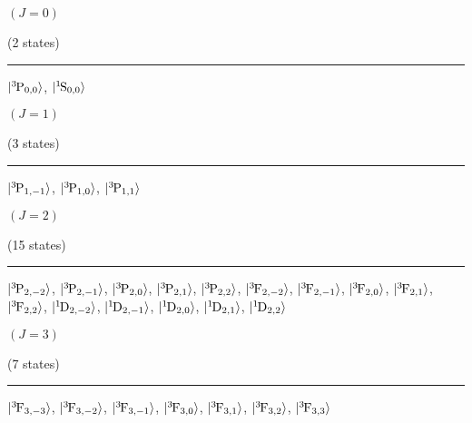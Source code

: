 \begin{mdframed}
\begin{center}
$(J=0)$

(2 states)
\vspace{0.25cm}
\hrule
\vspace{0.25cm}
$|{}^{3}{\kern-0.1em}{\text{P}}_{0,0}\rangle$, $|{}^{1}{\kern-0.1em}{\text{S}}_{0,0}\rangle$
\end{center}
\end{mdframed}

\begin{mdframed}
\begin{center}
$(J=1)$

(3 states)
\vspace{0.25cm}
\hrule
\vspace{0.25cm}
$|{}^{3}{\kern-0.1em}{\text{P}}_{1,-1}\rangle$, $|{}^{3}{\kern-0.1em}{\text{P}}_{1,0}\rangle$, $|{}^{3}{\kern-0.1em}{\text{P}}_{1,1}\rangle$
\end{center}
\end{mdframed}

\begin{mdframed}
\begin{center}
$(J=2)$

(15 states)
\vspace{0.25cm}
\hrule
\vspace{0.25cm}
$|{}^{3}{\kern-0.1em}{\text{P}}_{2,-2}\rangle$, $|{}^{3}{\kern-0.1em}{\text{P}}_{2,-1}\rangle$, $|{}^{3}{\kern-0.1em}{\text{P}}_{2,0}\rangle$, $|{}^{3}{\kern-0.1em}{\text{P}}_{2,1}\rangle$, $|{}^{3}{\kern-0.1em}{\text{P}}_{2,2}\rangle$, $|{}^{3}{\kern-0.1em}{\text{F}}_{2,-2}\rangle$, $|{}^{3}{\kern-0.1em}{\text{F}}_{2,-1}\rangle$, $|{}^{3}{\kern-0.1em}{\text{F}}_{2,0}\rangle$, $|{}^{3}{\kern-0.1em}{\text{F}}_{2,1}\rangle$, $|{}^{3}{\kern-0.1em}{\text{F}}_{2,2}\rangle$, $|{}^{1}{\kern-0.1em}{\text{D}}_{2,-2}\rangle$, $|{}^{1}{\kern-0.1em}{\text{D}}_{2,-1}\rangle$, $|{}^{1}{\kern-0.1em}{\text{D}}_{2,0}\rangle$, $|{}^{1}{\kern-0.1em}{\text{D}}_{2,1}\rangle$, $|{}^{1}{\kern-0.1em}{\text{D}}_{2,2}\rangle$
\end{center}
\end{mdframed}

\begin{mdframed}
\begin{center}
$(J=3)$

(7 states)
\vspace{0.25cm}
\hrule
\vspace{0.25cm}
$|{}^{3}{\kern-0.1em}{\text{F}}_{3,-3}\rangle$, $|{}^{3}{\kern-0.1em}{\text{F}}_{3,-2}\rangle$, $|{}^{3}{\kern-0.1em}{\text{F}}_{3,-1}\rangle$, $|{}^{3}{\kern-0.1em}{\text{F}}_{3,0}\rangle$, $|{}^{3}{\kern-0.1em}{\text{F}}_{3,1}\rangle$, $|{}^{3}{\kern-0.1em}{\text{F}}_{3,2}\rangle$, $|{}^{3}{\kern-0.1em}{\text{F}}_{3,3}\rangle$
\end{center}
\end{mdframed}

